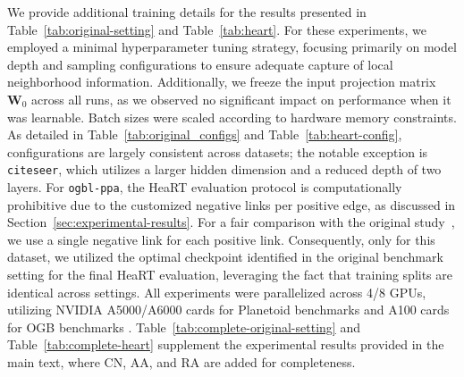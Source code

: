 \documentclass{article}
\theoremstyle{plain}
\theoremstyle{definition}
\theoremstyle{remark}
\begin{document}
We provide additional training details for the results presented in Table~\ref{tab:original-setting} and Table~\ref{tab:heart}. For these experiments, we employed a minimal hyperparameter tuning strategy, focusing primarily on model depth and sampling configurations to ensure adequate capture of local neighborhood information. Additionally, we freeze the input projection matrix $\mathbf{W}_0$ across all runs, as we observed no significant impact on performance when it was learnable. Batch sizes were scaled according to hardware memory constraints. As detailed in Table~\ref{tab:original_configs} and Table~\ref{tab:heart-config}, configurations are largely consistent across datasets; the notable exception is \texttt{citeseer}, which utilizes a larger hidden dimension and a reduced depth of two layers. For \texttt{ogbl-ppa}, the HeaRT evaluation protocol \cite{li_evaluating_2023} is computationally prohibitive due to the customized negative links per positive edge, as discussed in Section~\ref{sec:experimental-results}. For a fair comparison with the original study~\cite{li_evaluating_2023}, we use a single negative link for each positive link. Consequently, only for this dataset, we utilized the optimal checkpoint identified in the original benchmark setting for the final HeaRT evaluation, leveraging the fact that training splits are identical across settings. All experiments were parallelized across 4/8 GPUs, utilizing NVIDIA A5000/A6000 cards for Planetoid benchmarks \cite{yang_revisiting_2016} and A100 cards for OGB benchmarks \cite{hu2020ogb}. Table~\ref{tab:complete-original-setting} and Table~\ref{tab:complete-heart} supplement the experimental results provided in the main text, where CN, AA, and RA are added for completeness.
\end{document}
